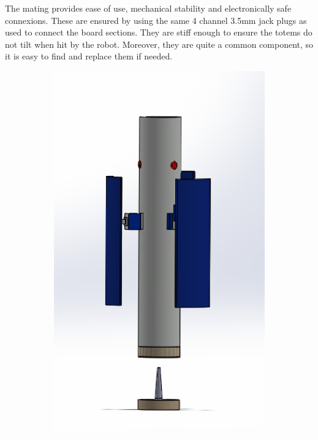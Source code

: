 \documentclass[a4paper,twoside]{book}
\begin{document}
The mating provides ease of use, mechanical stability and electronically safe connexions.
These are ensured by using the same 4 channel 3.5mm jack plugs as used to connect the board sections.
They are stiff enough to ensure the totems do not tilt when hit by the robot.
Moreover, they are quite a common component, so it is easy to find and replace them if needed.

\begin{figure}
    \begin{subfigure}[b]{0.4\textwidth}
    \includegraphics[width=\textwidth]{img/totem_nuovo2}

\end{subfigure}
\end{figure}
\end{document}
